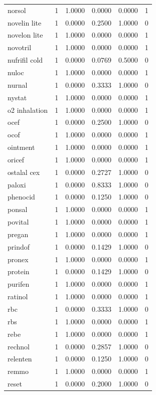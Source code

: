 \begin{longtable}{p{3.0cm}rrrrr}
norsol & 1 & 1.0000 & 0.0000 & 0.0000 & 1 \\
novelin lite & 1 & 0.0000 & 0.2500 & 1.0000 & 0 \\
novelon lite & 1 & 1.0000 & 0.0000 & 0.0000 & 1 \\
novotril & 1 & 1.0000 & 0.0000 & 0.0000 & 1 \\
nufrifil cold & 1 & 0.0000 & 0.0769 & 0.5000 & 0 \\
nuloc & 1 & 1.0000 & 0.0000 & 0.0000 & 1 \\
nurnal & 1 & 0.0000 & 0.3333 & 1.0000 & 0 \\
nystat & 1 & 1.0000 & 0.0000 & 0.0000 & 1 \\
o2 inhalation & 1 & 1.0000 & 0.0000 & 0.0000 & 1 \\
ocef & 1 & 0.0000 & 0.2500 & 1.0000 & 0 \\
ocof & 1 & 1.0000 & 0.0000 & 0.0000 & 1 \\
ointment & 1 & 1.0000 & 0.0000 & 0.0000 & 1 \\
oricef & 1 & 1.0000 & 0.0000 & 0.0000 & 1 \\
ostalal cex & 1 & 0.0000 & 0.2727 & 1.0000 & 0 \\
paloxi & 1 & 0.0000 & 0.8333 & 1.0000 & 0 \\
phenocid & 1 & 0.0000 & 0.1250 & 1.0000 & 0 \\
ponsal & 1 & 1.0000 & 0.0000 & 0.0000 & 1 \\
povital & 1 & 1.0000 & 0.0000 & 0.0000 & 1 \\
pregan & 1 & 1.0000 & 0.0000 & 0.0000 & 1 \\
prindof & 1 & 0.0000 & 0.1429 & 1.0000 & 0 \\
pronex & 1 & 1.0000 & 0.0000 & 0.0000 & 1 \\
protein & 1 & 0.0000 & 0.1429 & 1.0000 & 0 \\
purifen & 1 & 1.0000 & 0.0000 & 0.0000 & 1 \\
ratinol & 1 & 1.0000 & 0.0000 & 0.0000 & 1 \\
rbc & 1 & 0.0000 & 0.3333 & 1.0000 & 0 \\
rbs & 1 & 1.0000 & 0.0000 & 0.0000 & 1 \\
rebe & 1 & 1.0000 & 0.0000 & 0.0000 & 1 \\
rechnol & 1 & 0.0000 & 0.2857 & 1.0000 & 0 \\
relenten & 1 & 0.0000 & 0.1250 & 1.0000 & 0 \\
remmo & 1 & 1.0000 & 0.0000 & 0.0000 & 1 \\
reset & 1 & 0.0000 & 0.2000 & 1.0000 & 0 \\

\end{longtable}
